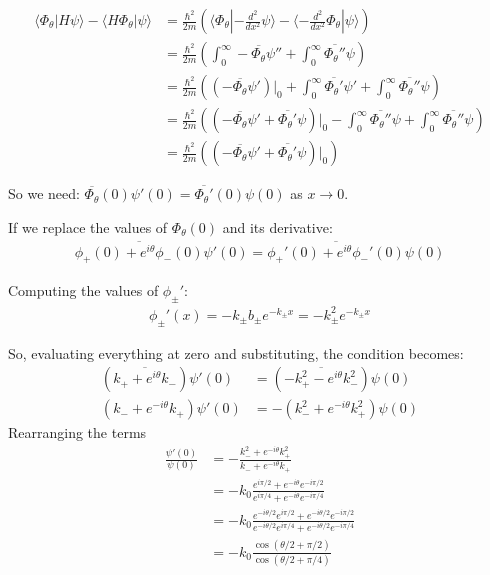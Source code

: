 \begin{align*}
    \langle \Phi_\theta | H \psi \rangle - \langle H \Phi_\theta |  \psi \rangle
     & = \frac{\hbar^2}{2m} \left(\langle \Phi_\theta | - \frac{d^2}{dx^2} \psi \rangle - \langle - \frac{d^2}{dx^2} \Phi_\theta |  \psi \rangle \right)                                                                 \\
     & =  \frac{\hbar^2}{2m} \left(\int_0^\infty -\overline{\Phi_\theta} \psi'' + \int_0^\infty \overline{\Phi_\theta''} \psi \right)                                                                      \\
     & = \frac{\hbar^2}{2m} \left((-\overline{\Phi_\theta} \psi')\Big|_0 + \int_0^\infty \overline{\Phi_\theta'} \psi' + \int_0^\infty \overline{\Phi_\theta''} \psi  \right)                              \\
     & = \frac{\hbar^2}{2m} \left((-\overline{\Phi_\theta} \psi' + \overline{\Phi_\theta'} \psi)\Big|_0 - \int_0^\infty \overline{\Phi_\theta''} \psi + \int_0^\infty \overline{\Phi_\theta''} \psi\right) \\
     & = \frac{\hbar^2}{2m} \left((-\overline{\Phi_\theta} \psi' + \overline{\Phi_\theta'} \psi)\Big|_0\right)
\end{align*}

\noindent
So we need: $\overline{\Phi_\theta}(0) \psi'(0) = \overline{\Phi_\theta'}(0) \psi(0)$ as $x \rightarrow 0$.

If we replace the values of $\Phi_\theta (0)$ and its derivative:
\begin{align*}
    \overline{\phi_+(0) + e^{i\theta} \phi_-(0)} \psi'(0) = \overline{\phi_+'(0) + e^{i\theta} \phi_-'(0)} \psi(0)
\end{align*}

\noindent
Computing the values of $\phi_\pm'$:
\begin{align*}
    \phi_\pm' (x) = -k_\pm b_\pm e^{-k_\pm x} = -k_\pm^2 e^{-k_\pm x}
\end{align*}

\noindent
So, evaluating everything at zero and substituting, the condition becomes:
\begin{align*}
    (\overline{k_+ + e^{i\theta}k_-}) \psi'(0) & = (\overline{-k_+^2 - e^{i\theta} k_-^2} )\psi(0) \\
    (k_- + e^{-i\theta}k_+) \psi'(0)           & = -(k_-^2 + e^{-i\theta} k_+^2 )\psi(0)
\end{align*}
Rearranging the terms
\begin{align*}
    \frac{\psi'(0)}{\psi(0)}
     & = - \frac{k_-^2 + e^{-i\theta} k_+^2}{k_- + e^{-i\theta}k_+}                                                                         \\
     & = - k_0 \frac{e^{i \pi /2} + e^{-i\theta} e^{- i \pi /2}}{e^{i \pi /4} + e^{-i\theta}e^{- i \pi /4}}                                 \\
     & = - k_0 \frac{e^{-i\theta/2}e^{i \pi /2} + e^{-i\theta/2} e^{- i \pi /2}}{e^{-i\theta/2}e^{i \pi /4} + e^{-i\theta/2}e^{- i \pi /4}} \\
     & = - k_0 \frac{\cos(\theta/2 + \pi/2)}{\cos(\theta/2 + \pi/4)}
\end{align*}

